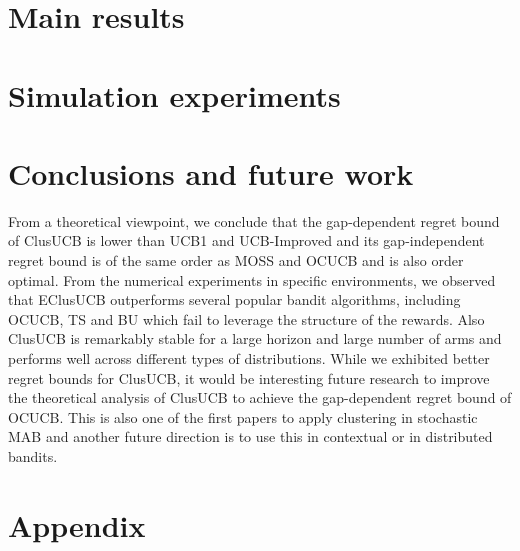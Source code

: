 \documentclass{article}
\begin{document}
\section{Main results}
\label{sec:results}



\section{Simulation experiments}
\label{sec:expts}



\section{Conclusions and future work}
\label{sec:conclusions}
From a theoretical viewpoint, we conclude that the gap-dependent regret bound of ClusUCB is lower than UCB1 and UCB-Improved and its gap-independent regret bound is of the same order as MOSS and OCUCB and is also order optimal. From the numerical experiments in specific environments, we observed that EClusUCB outperforms several popular bandit algorithms,  including OCUCB, TS and BU which fail to leverage the structure of the rewards. Also ClusUCB is remarkably stable for a large horizon and large number of arms and performs well across different types of distributions. While we exhibited better regret bounds for ClusUCB, it would be interesting future research to improve the theoretical analysis of ClusUCB to achieve the gap-dependent regret bound of OCUCB. This is also one of the first papers to apply clustering in stochastic MAB and another future direction is to use this in contextual or in distributed bandits. 



\clearpage
\newpage



%



\clearpage
\newpage
\section*{Appendix}

\end{document}
